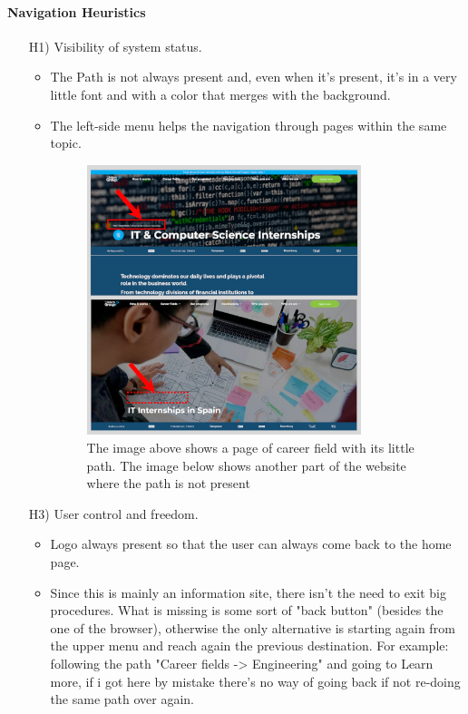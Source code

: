 \documentclass[11pt, letterpaper]{article}
\begin{document}
\paragraph{Navigation Heuristics}
    \begin{enumerate}
        \item[H1)] Visibility of system status.
            \begin{itemize}
                \item The Path is not always present and, even when it's present, it's in a very little font and with a color that merges with the background.
                \item The left-side menu helps the navigation through pages within the same topic.
                \begin{figure}[H]
                    \centering
                    \includegraphics[width=8cm]{images/inspection/H1.png}
                    \caption{The image above shows a page of career field with its little path. The image below shows another part of the website where the path is not present}
                \end{figure}
            \end{itemize}
        \item[H3)] User control and freedom.
            \begin{itemize}
                \item Logo always present so that the user can always come back to the home page.
                \item Since this is mainly an information site, there isn't the need to exit big procedures. What is missing is some sort of "back button" (besides the one of the browser), otherwise the only alternative is starting again from the upper menu and reach again the previous destination. For example: following the path "Career fields -> Engineering" and going to Learn more, if i got here by mistake there's no way of going back if not re-doing the same path over again.

\end{itemize}
\end{enumerate}
\end{document}
